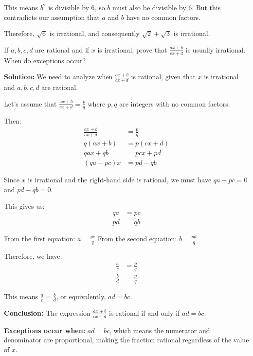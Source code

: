 This means $b^2$ is divisible by 6, so $b$ must also be divisible by 6. But this contradicts our assumption that $a$ and $b$ have no common factors.

Therefore, $\sqrt{6}$ is irrational, and consequently $\sqrt{2} + \sqrt{3}$ is irrational.

\begin{problembox}
If $a, b, c, d$ are rational and if $x$ is irrational, prove that $\frac{ax + b}{cx + d}$ is usually irrational. When do exceptions occur?
\end{problembox}

\textbf{Solution:}
We need to analyze when $\frac{ax + b}{cx + d}$ is rational, given that $x$ is irrational and $a, b, c, d$ are rational.

Let's assume that $\frac{ax + b}{cx + d} = \frac{p}{q}$ where $p, q$ are integers with no common factors.

Then:
\begin{align*}
\frac{ax + b}{cx + d} &= \frac{p}{q} \\
q(ax + b) &= p(cx + d) \\
qax + qb &= pcx + pd \\
(qa - pc)x &= pd - qb
\end{align*}

Since $x$ is irrational and the right-hand side is rational, we must have $qa - pc = 0$ and $pd - qb = 0$.

This gives us:
\begin{align*}
qa &= pc \\
pd &= qb
\end{align*}

From the first equation: $a = \frac{pc}{q}$
From the second equation: $b = \frac{pd}{q}$

Therefore, we have:
\begin{align*}
\frac{a}{c} &= \frac{p}{q} \\
\frac{b}{d} &= \frac{p}{q}
\end{align*}

This means $\frac{a}{c} = \frac{b}{d}$, or equivalently, $ad = bc$.

\textbf{Conclusion:}
The expression $\frac{ax + b}{cx + d}$ is rational if and only if $ad = bc$.

\textbf{Exceptions occur when:}
$ad = bc$, which means the numerator and denominator are proportional, making the fraction rational regardless of the value of $x$.

